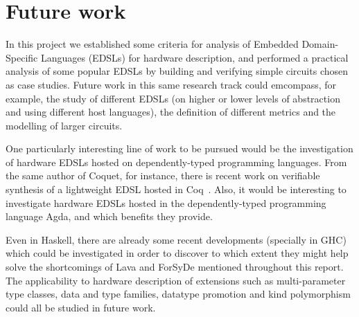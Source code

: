 \section{Future work}
\label{sec:future-work}

    In this project we established some criteria for analysis of Embedded Domain-Specific Languages
    (EDSLs) for hardware description, and performed a practical analysis of some popular EDSLs by
    building and verifying simple circuits chosen as case studies. Future work in this same research
    track could emcompass, for example, the study of different EDSLs (on higher or lower levels of
    abstraction and using different host languages), the definition of different metrics and the
    modelling of larger circuits.

    One particularly interesting line of work to be pursued would be the investigation of hardware
    EDSLs hosted on dependently-typed programming languages. From the same author of Coquet, for
    instance, there is recent work on verifiable synthesis of a lightweight EDSL hosted in
    Coq~\cite{braibant2013formal}. Also, it would be interesting to investigate hardware EDSLs
    hosted in the dependently-typed programming language Agda, and which benefits they provide.

    Even in Haskell, there are already some recent developments (specially in GHC) which could be
    investigated in order to discover to which extent they might help solve the shortcomings of Lava
    and ForSyDe mentioned throughout this report. The applicability to hardware description of
    extensions such as multi-parameter type classes, data and type families, datatype promotion and
    kind polymorphism could all be studied in future work.

